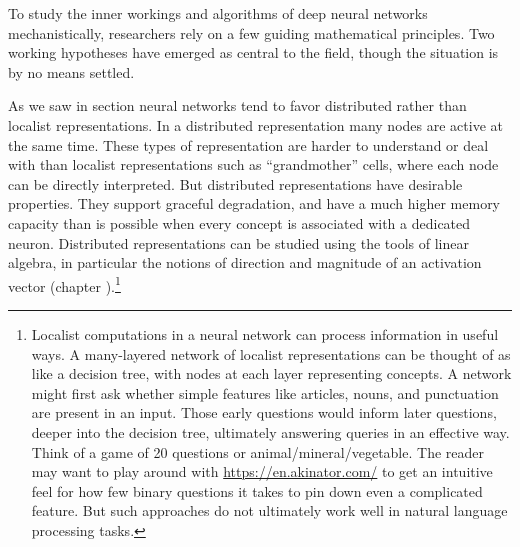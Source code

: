To study the inner workings and algorithms of deep neural networks
mechanistically, researchers rely on a few guiding mathematical principles. Two
working hypotheses have emerged as central to the field, though the situation
is by no means settled.


As we saw in section  neural networks tend to
favor distributed rather than localist representations. In a distributed
representation many nodes are active at the same time. These types of
representation are harder to understand or deal with than localist
representations such as ``grandmother'' cells, where each node can be directly
interpreted. But distributed  representations have desirable properties. They
support graceful degradation, and have a much higher memory capacity than is
possible when every concept is associated with a dedicated neuron.  Distributed
representations can be studied using the tools of linear algebra, in particular
the notions of direction and magnitude of an activation vector (chapter
).\footnote{Localist computations in a neural network
can process information in useful ways. A many-layered network of localist
representations can be thought of as like a decision tree, with nodes at each
layer representing concepts. A network might first ask whether simple features
like articles, nouns, and punctuation are present in an input. Those early
questions would inform later questions, deeper into the decision tree,
ultimately answering queries in an effective way. Think of a game of 20
questions or animal/mineral/vegetable. The reader may want to play around with
\url{https://en.akinator.com/} to get an intuitive feel for how few binary
questions it takes to pin down even a complicated feature. But such approaches
do not ultimately work well in natural language processing tasks.} 

